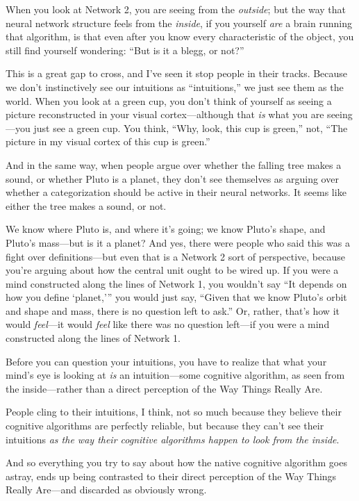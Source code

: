 {
 When you look at Network 2, you are seeing from the
\textit{outside}; but the way that neural network structure feels from
the \textit{inside}, if you yourself \textit{are} a brain running that
algorithm, is that even after you know every characteristic of the
object, you still find yourself wondering: ``But is it
a blegg, or not?''}

{
 This is a great gap to cross, and I've seen it
stop people in their tracks. Because we don't
instinctively see our intuitions as
``intuitions,'' we just see them as
the world. When you look at a green cup, you don't
think of yourself as seeing a picture reconstructed in your visual
cortex---although that \textit{is} what you are seeing---you just see a
green cup. You think, ``Why, look, this cup is
green,'' not, ``The picture in my
visual cortex of this cup is green.''}

{
 And in the same way, when people argue over whether the falling
tree makes a sound, or whether Pluto is a planet, they
don't see themselves as arguing over whether a
categorization should be active in their neural networks. It seems like
either the tree makes a sound, or not.}

{
 We know where Pluto is, and where it's going; we
know Pluto's shape, and Pluto's
mass---but is it a planet? And yes, there were people who said this was
a fight over definitions---but even that is a Network 2 sort of
perspective, because you're arguing about how the
central unit ought to be wired up. If you were a mind constructed along
the lines of Network 1, you wouldn't say
``It depends on how you define
`planet,''' you would
just say, ``Given that we know Pluto's
orbit and shape and mass, there is no question left to
ask.'' Or, rather, that's how it
would \textit{feel}{}---it would \textit{feel} like there was no
question left---if you were a mind constructed along the lines of
Network 1.}

{
 Before you can question your intuitions, you have to realize that
what your mind's eye is looking at \textit{is} an
intuition---some cognitive algorithm, as seen from the inside---rather
than a direct perception of the Way Things Really Are.}

{
 People cling to their intuitions, I think, not so much because
they believe their cognitive algorithms are perfectly reliable, but
because they can't see their intuitions \textit{as the
way their cognitive algorithms happen to look from the inside}.}

{
 And so everything you try to say about how the native cognitive
algorithm goes astray, ends up being contrasted to their direct
perception of the Way Things Really Are---and discarded as obviously
wrong.}

